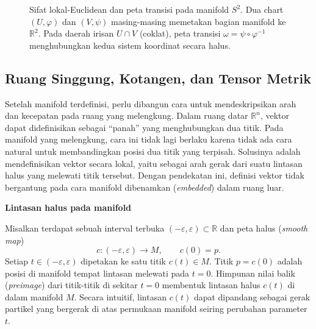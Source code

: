 \begin{figure}[H]
\caption{Sifat lokal-Euclidean dan peta transisi pada manifold $S^2$. Dua chart $(U, \varphi)$ dan $(V, \psi)$ masing-masing memetakan bagian manifold ke $\mathbb{R}^2$. Pada daerah irisan $U \cap V$ (coklat), peta transisi $\omega = \psi \circ \varphi^{-1}$ menghubungkan kedua sistem koordinat secara halus.}
\label{fig:lokal-euclidean}
\end{figure}

\subsection{Ruang Singgung, Kotangen, dan Tensor Metrik}
\label{subsec:tangent-cotangent}

Setelah manifold terdefinisi, perlu dibangun cara untuk mendeskripsikan arah dan kecepatan pada ruang yang melengkung. Dalam ruang datar $\mathbb{R}^n$, vektor dapat didefinisikan sebagai ``panah'' yang menghubungkan dua titik. Pada manifold yang melengkung, cara ini tidak lagi berlaku karena tidak ada cara natural untuk membandingkan posisi dua titik yang terpisah. Solusinya adalah mendefinisikan vektor secara lokal, yaitu sebagai arah gerak dari suatu lintasan halus yang melewati titik tersebut. Dengan pendekatan ini, definisi vektor tidak bergantung pada cara manifold dibenamkan (\textit{embedded}) dalam ruang luar.


\vspace{0.5em}
\noindent \textbf{Lintasan halus pada manifold}

Misalkan terdapat sebuah interval terbuka $(-\varepsilon, \varepsilon) \subset \mathbb{R}$ dan peta halus (\textit{smooth map})
\begin{equation}
    c : (-\varepsilon, \varepsilon) \longrightarrow M, \qquad c(0) = p.
\end{equation}
Setiap $t \in (-\varepsilon, \varepsilon)$ dipetakan ke satu titik $c(t) \in M$. Titik $p = c(0)$ adalah posisi di manifold tempat lintasan melewati pada $t = 0$. Himpunan nilai balik (\textit{preimage}) dari titik-titik di sekitar $t = 0$ membentuk lintasan halus $c(t)$ di dalam manifold $M$. Secara intuitif, lintasan $c(t)$ dapat dipandang sebagai gerak partikel yang bergerak di atas permukaan manifold seiring perubahan parameter $t$.

